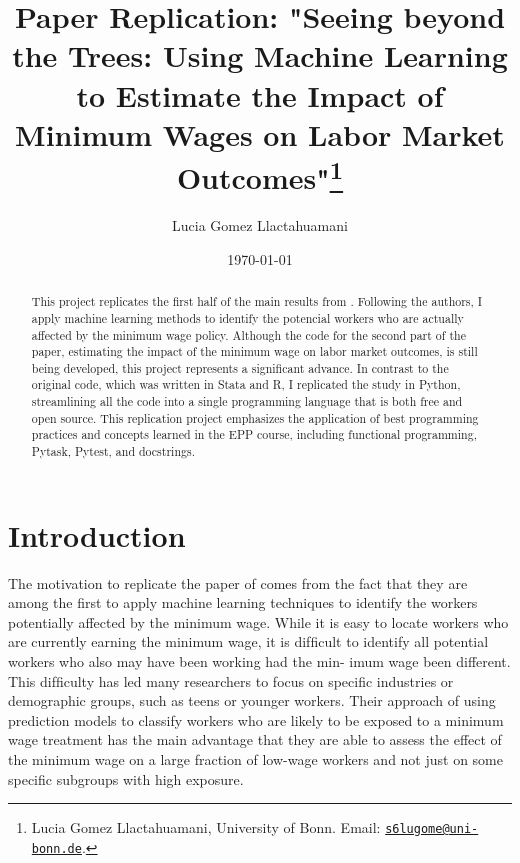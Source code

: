 \documentclass[11pt, a4paper, leqno]{article}
\begin{document}
\title{Paper Replication: "Seeing beyond the Trees: Using Machine Learning to Estimate the Impact of Minimum Wages on Labor Market Outcomes"\thanks{Lucia Gomez Llactahuamani, University of Bonn. Email: \href{mailto:s6lugome@uni-bonn.de}{\nolinkurl{s6lugome@uni-bonn.de}}.}}

\author{Lucia Gomez Llactahuamani}

\date{\today}

\maketitle


\begin{abstract}

This project replicates the first half of the main results from \citet{cengiz2022seeing}.
Following the authors, I apply machine learning methods to identify the potencial workers 
who are actually affected by the minimum wage policy. Although the code for the second part 
of the paper, estimating the impact of the minimum wage on labor market outcomes, is still 
being developed, this project represents a significant advance. In contrast to the original 
code, which was written in Stata and R, I replicated the study in Python, streamlining all 
the code into a single programming language that is both free and open source. 
This replication project emphasizes the application of best programming practices and 
concepts learned in the EPP course, including functional programming, Pytask, Pytest, and docstrings.
\end{abstract}

\clearpage


\section{Introduction} %
\label{sec:introduction}

The motivation to replicate the paper of \citet{cengiz2022seeing} comes from the fact that 
they are among the first to apply machine learning techniques to identify the workers 
potentially affected by the minimum wage. While it is easy to locate workers who are 
currently earning the minimum wage, it is difﬁcult to
identify all potential workers who also may have been working had the min-
imum wage been different. This difﬁculty has led many researchers to focus
on speciﬁc industries or demographic groups, such as
teens or younger workers. Their approach of using prediction models 
to classify workers who are likely to be exposed to a minimum wage treatment 
has the main advantage that they are able to 
assess the effect of the minimum wage on a large fraction of low-wage
workers and not just on some speciﬁc subgroups with high exposure.
\end{document}
